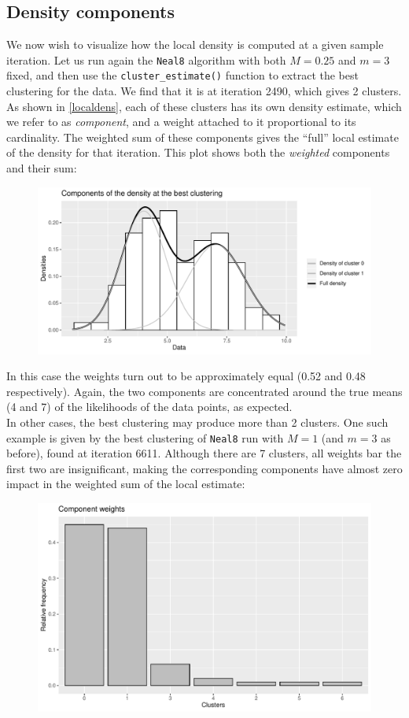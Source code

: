 \subsection{Density components}
We now wish to visualize how the local density is computed at a given sample iteration.
Let us run again the \verb|Neal8| algorithm with both $M=0.25$ and $m=3$ fixed, and then use the \verb|cluster_estimate()| function to extract the best clustering for the data.
We find that it is at iteration 2490, which gives 2 clusters.
As shown in \ref{localdens}, each of these clusters has its own density estimate, which we refer to as \emph{component}, and a weight attached to it proportional to its cardinality.
The weighted sum of these components gives the ``full'' local estimate of the density for that iteration.
This plot shows both the \emph{weighted} components and their sum:
\begin{figure}[h]
	\centering
	\includegraphics[scale=0.62]{etc/componentsM025m3_best.pdf}
\end{figure}

In this case the weights turn out to be approximately equal (0.52 and 0.48 respectively).
Again, the two components are concentrated around the true means (4 and 7) of the likelihoods of the data points, as expected. \\
In other cases, the best clustering may produce more than 2 clusters.
One such example is given by the best clustering of \verb|Neal8| run with $M=1$ (and $m=3$ as before), found at iteration 6611.
Although there are 7 clusters, all weights bar the first two are insignificant, making the corresponding components have almost zero impact in the weighted sum of the local estimate:
\begin{figure}[h]
	\centering
	\includegraphics[scale=0.44]{etc/barplotM1m3.pdf}
\end{figure}

